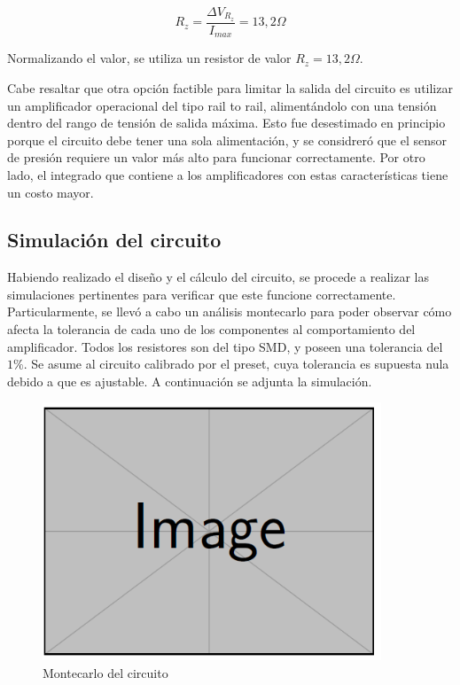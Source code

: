 \begin{equation}
R_z = \frac{\Delta V_{R_z}}{I_{max}} = 13,2 \Omega
\end{equation}

Normalizando el valor, se utiliza un resistor de valor $R_z = 13,2 \Omega$.

Cabe resaltar que otra opci\'on factible para limitar la salida del circuito es utilizar un amplificador operacional del tipo rail to rail, aliment\'andolo con una tensi\'on dentro del rango de tensi\'on de salida m\'axima. Esto fue desestimado en principio porque el circuito debe tener una sola alimentaci\'on, y se considrer\'o que el sensor de presi\'on requiere un valor m\'as alto para funcionar correctamente. Por otro lado, el integrado que contiene a los amplificadores con estas caracter\'isticas tiene un costo mayor.

\subsection{Simulaci\'on del circuito}

Habiendo realizado el dise\~no y el c\'alculo del circuito, se procede a realizar las simulaciones pertinentes para verificar que este funcione correctamente. Particularmente, se llev\'o a cabo un an\'alisis montecarlo para poder observar c\'omo afecta la tolerancia de cada uno de los componentes al comportamiento del amplificador. Todos los resistores son del tipo SMD, y poseen una tolerancia del $1\%$. Se asume al circuito calibrado por el preset, cuya tolerancia es supuesta nula debido a que es ajustable. A continuaci\'on se adjunta la simulaci\'on.

\begin{figure}[H]
    \centering
    \includegraphics[width=0.9\textwidth]{../EJ4/resources/montecarlo.png}
	\caption{Montecarlo del circuito}
   	\label{fig:EJ4_montecarlo}
\end{figure}


